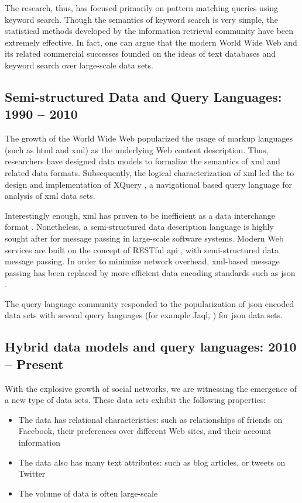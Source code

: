 		The research, thus, has focused primarily on pattern matching queries using keyword search.  Though the semantics of keyword search is very simple, the statistical methods developed by the information retrieval community \cite{salton-88, robertson-09, dumais-88} have been extremely effective.  In fact, one can argue that the modern World Wide Web and its related commercial successes founded on the ideas of text databases and keyword search over large-scale data sets.
		
	\subsection{Semi-structured Data and Query Languages:  1990 -- 2010}
		The growth of the World Wide Web popularized the usage of markup languages (such as \gls{html} and \gls{xml}) as the underlying Web content description.  Thus, researchers have designed data models \cite{suciu-98} to formalize the semantics of \gls{xml} and related data formats.  Subsequently, the logical characterization of \gls{xml} led the to design and implementation of XQuery \cite{xquery-10}, a navigational based query language for analysis of \gls{xml} data sets.
		
		Interestingly enough, \gls{xml} has proven to be inefficient as a data interchange format \cite{schneider-14}.  Nonetheless, a semi-structured data description language is highly sought after for message passing in large-scale software systems.  Modern Web services are built on the concept of RESTful \gls{api} \cite{restful-11}, with semi-structured data message passing.  In order to minimize network overhead, \gls{xml}-based message passing has been replaced by more efficient data encoding standards such as \gls{json} \cite{json}.
		
		The query language community responded to the popularization of \gls{json} encoded data sets with several query languages \cite{simeon-13} (for example Jaql, \cite{ibm-jaql}) for \gls{json} data sets.
	
	\subsection{Hybrid data models and query languages: 2010 -- Present}
		With the explosive growth of social networks, we are witnessing the emergence of a new type of data sets.  These data sets exhibit the following properties:
		
		\begin{itemize}
			\item The data has relational characteristics: such as relationships of friends on Facebook, their preferences over different Web sites, and their account information
			\item The data also has many text attributes: such as blog articles, or tweets on Twitter
			\item The volume of data is often large-scale
		\end{itemize}
		
